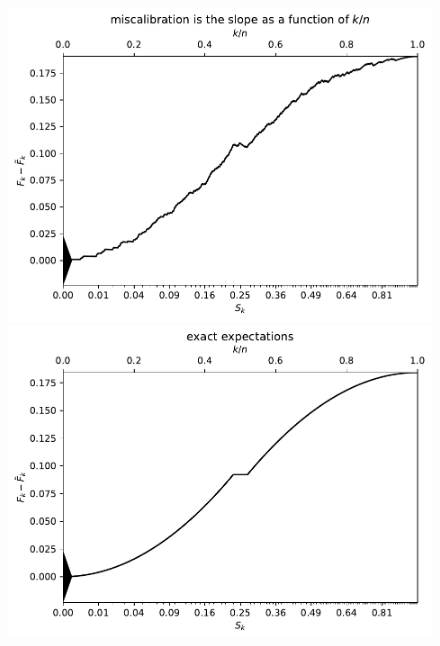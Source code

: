 \documentclass{article}
\begin{document}
\begin{figure}
\begin{centering}

\parbox{\imsize}{\includegraphics[width=\imsize]
                {./codes/unweighted/1000_10_1_2/cumulative.pdf}}
\quad\quad
\parbox{\imsize}{\includegraphics[width=\imsize]
                {./codes/unweighted/1000_10_1_2/cumulative_exact.pdf}}

\vspace{\vertsep}


\end{centering}
\end{figure}
\end{document}
